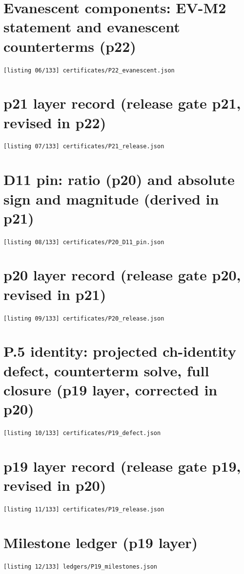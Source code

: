 \section{Evanescent components: EV-M2 statement and evanescent counterterms (p22)}
\noindent\texttt{[listing 06/133] certificates/P22\_evanescent.json}
{\scriptsize}

\section{p21 layer record (release gate p21, revised in p22)}
\noindent\texttt{[listing 07/133] certificates/P21\_release.json}
{\scriptsize}

\section{D11 pin: ratio (p20) and absolute sign and magnitude (derived in p21)}
\noindent\texttt{[listing 08/133] certificates/P20\_D11\_pin.json}
{\scriptsize}

\section{p20 layer record (release gate p20, revised in p21)}
\noindent\texttt{[listing 09/133] certificates/P20\_release.json}
{\scriptsize}

\section{P.5 identity: projected ch-identity defect, counterterm solve, full closure (p19 layer, corrected in p20)}
\noindent\texttt{[listing 10/133] certificates/P19\_defect.json}
{\scriptsize}

\section{p19 layer record (release gate p19, revised in p20)}
\noindent\texttt{[listing 11/133] certificates/P19\_release.json}
{\scriptsize}

\section{Milestone ledger (p19 layer)}
\noindent\texttt{[listing 12/133] ledgers/P19\_milestones.json}
{\scriptsize}


